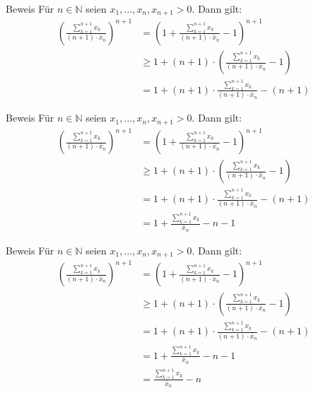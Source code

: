 \documentclass[10pt]{beamer}
\def\bN{\mathbb{N}}
\begin{document}
\begin{frame}{Beweis}
    Für \( n \in \bN \) seien \( x_{1}, \ldots, x_{n}, x_{n + 1} > 0 \). Dann gilt:
    \begin{align*}
        \left( \frac{\sum_{k = 1}^{n + 1} x_{k}}{\left( n + 1 \right) \cdot \bar{x}_{n}} \right)^{n + 1}
        & = \left( 1 + \frac{\sum_{k = 1}^{n + 1} x_{k}}{\left( n + 1 \right) \cdot \bar{x}_{n}} - 1 \right)^{n + 1} \\
        & \geq 1 + \left( n + 1 \right) \cdot \left( \frac{\sum_{k = 1}^{n + 1} x_{k}}{\left( n + 1 \right) \cdot \bar{x}_{n}} - 1 \right) \\
        & = 1 + \left( n + 1 \right) \cdot \frac{\sum_{k = 1}^{n + 1} x_{k}}{\left( n + 1 \right) \cdot \bar{x}_{n}} - \left( n + 1 \right)
    \end{align*}
\end{frame}



\begin{frame}{Beweis}
    Für \( n \in \bN \) seien \( x_{1}, \ldots, x_{n}, x_{n + 1} > 0 \). Dann gilt:
    \begin{align*}
        \left( \frac{\sum_{k = 1}^{n + 1} x_{k}}{\left( n + 1 \right) \cdot \bar{x}_{n}} \right)^{n + 1}
        & = \left( 1 + \frac{\sum_{k = 1}^{n + 1} x_{k}}{\left( n + 1 \right) \cdot \bar{x}_{n}} - 1 \right)^{n + 1} \\
        & \geq 1 + \left( n + 1 \right) \cdot \left( \frac{\sum_{k = 1}^{n + 1} x_{k}}{\left( n + 1 \right) \cdot \bar{x}_{n}} - 1 \right) \\
        & = 1 + \left( n + 1 \right) \cdot \frac{\sum_{k = 1}^{n + 1} x_{k}}{\left( n + 1 \right) \cdot \bar{x}_{n}} - \left( n + 1 \right) \\
        & = 1 + \frac{\sum_{k = 1}^{n + 1} x_{k}}{\bar{x}_{n}} - n - 1
    \end{align*}
\end{frame}



\begin{frame}{Beweis}
    Für \( n \in \bN \) seien \( x_{1}, \ldots, x_{n}, x_{n + 1} > 0 \). Dann gilt:
    \begin{align*}
        \left( \frac{\sum_{k = 1}^{n + 1} x_{k}}{\left( n + 1 \right) \cdot \bar{x}_{n}} \right)^{n + 1}
        & = \left( 1 + \frac{\sum_{k = 1}^{n + 1} x_{k}}{\left( n + 1 \right) \cdot \bar{x}_{n}} - 1 \right)^{n + 1} \\
        & \geq 1 + \left( n + 1 \right) \cdot \left( \frac{\sum_{k = 1}^{n + 1} x_{k}}{\left( n + 1 \right) \cdot \bar{x}_{n}} - 1 \right) \\
        & = 1 + \left( n + 1 \right) \cdot \frac{\sum_{k = 1}^{n + 1} x_{k}}{\left( n + 1 \right) \cdot \bar{x}_{n}} - \left( n + 1 \right) \\
        & = 1 + \frac{\sum_{k = 1}^{n + 1} x_{k}}{\bar{x}_{n}} - n - 1 \\
        & = \frac{\sum_{k = 1}^{n + 1} x_{k}}{\bar{x}_{n}} - n
    \end{align*}
\end{frame}
\end{document}
